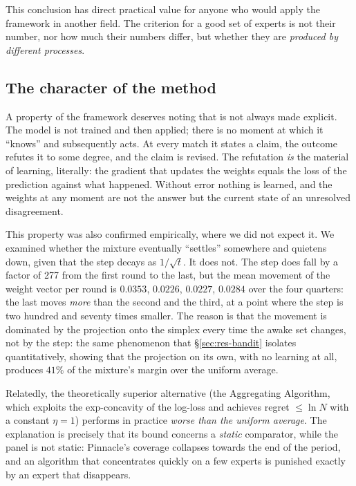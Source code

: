 \documentclass[12pt,a4paper,oneside]{report}
\renewcommand{\_}{\oldunderscore\allowbreak}
\theoremstyle{definition}
\theoremstyle{plain}
\theoremstyle{remark}
\begin{document}
This conclusion has direct practical value for anyone who would apply the framework in another
field. The criterion for a good set of experts is not their number, nor how much their numbers
differ, but whether they are \emph{produced by different processes}.

\subsection{The character of the method}

A property of the framework deserves noting that is not always made explicit. The model is not
trained and then applied; there is no moment at which it ``knows'' and subsequently acts. At every
match it states a claim, the outcome refutes it to some degree, and the claim is revised. The
refutation \emph{is} the material of learning, literally: the gradient that updates the weights
equals the loss of the prediction against what happened. Without error nothing is learned, and the
weights at any moment are not the answer but the current state of an unresolved disagreement.

This property was also confirmed empirically, where we did not expect it. We examined whether the
mixture eventually ``settles'' somewhere and quietens down, given that the step decays as
$1/\sqrt{t}$. It does not. The step does fall by a factor of 277 from the first round to the last,
but the mean movement of the weight vector per round is $0.0353$, $0.0226$, $0.0227$, $0.0284$
over the four quarters: the last moves \emph{more} than the second and the third, at a point where
the step is two hundred and seventy times smaller. The reason is that the movement is dominated by
the projection onto the simplex every time the awake set changes, not by the step: the same
phenomenon that \S\ref{sec:res-bandit} isolates quantitatively, showing that the projection on
its own, with no learning at all, produces $41\%$ of the mixture's margin over the uniform
average.

Relatedly, the theoretically superior alternative (the Aggregating Algorithm, which exploits
the exp-concavity of the log-loss and achieves regret $\leq \ln N$ with a constant $\eta=1$)
performs in practice \emph{worse than the uniform average}. The explanation is precisely that
its bound concerns a \emph{static} comparator, while the panel is not static: Pinnacle's
coverage collapses towards the end of the period, and an algorithm that concentrates quickly on
a few experts is punished exactly by an expert that disappears.
\end{document}
